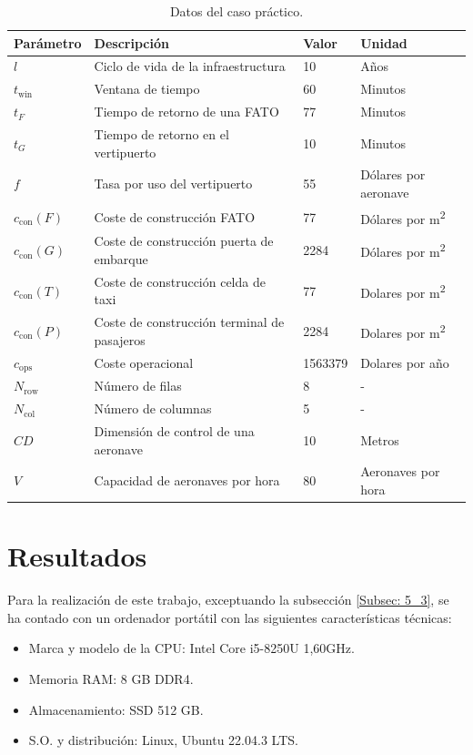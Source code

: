 \documentclass[12pt,a4paper]{book}
\begin{document}
\begin{table}[h]
    \centering
    \begin{tabular}{l l l l}
        \hline
        \textbf{Parámetro} & \textbf{Descripción} & \textbf{Valor} & \textbf{Unidad} \\
        \hline
        $l$ & Ciclo de vida de la infraestructura & 10 & Años \\
        $t_{\text{win}}$ & Ventana de tiempo & 60 & Minutos \\
        $t_F$ & Tiempo de retorno de una FATO & 77 & Minutos \\
        $t_G$ & Tiempo de retorno en el vertipuerto & 10 & Minutos \\
        $f$ & Tasa por uso del vertipuerto & 55 & Dólares por aeronave \\
        $c_{\text{con}}(F)$ & Coste de construcción FATO & 77 & Dólares por m\textsuperscript{2} \\
        $c_{\text{con}}(G)$ & Coste de construcción puerta de embarque & 2284 & Dólares por m\textsuperscript{2} \\
        $c_{\text{con}}(T)$ & Coste de construcción celda de taxi & 77 & Dolares por m\textsuperscript{2} \\
        $c_{\text{con}}(P)$ & Coste de construcción terminal de pasajeros & 2284 & Dolares por m\textsuperscript{2} \\
        $c_{\text{ops}}$ & Coste operacional & 1563379 & Dolares por año \\
        $N_{\text{row}}$ & Número de filas & 8 & - \\
        $N_{\text{col}}$ & Número de columnas & 5 & - \\
        $CD$ & Dimensión de control de una aeronave & 10 & Metros \\
        $V$ & Capacidad de aeronaves por hora & 80 & Aeronaves por hora \\
        \hline
    \end{tabular}
    \caption{Datos del caso práctico.}
    \label{tab: valores_cte_PDV}
\end{table} 

\section{Resultados} \label{Subsec: 5_2}
Para la realización de este trabajo, exceptuando la subsección \ref{Subsec: 5_3}, se ha contado con un ordenador portátil con las siguientes características técnicas: 
\begin{itemize}
	\item Marca y modelo de la CPU: Intel Core i5-8250U 1,60GHz.
	\item Memoria RAM: 8 GB DDR4.
	\item Almacenamiento: SSD 512 GB.
	\item S.O. y distribución: Linux, Ubuntu 22.04.3 LTS.
\end{itemize}
\end{document}
